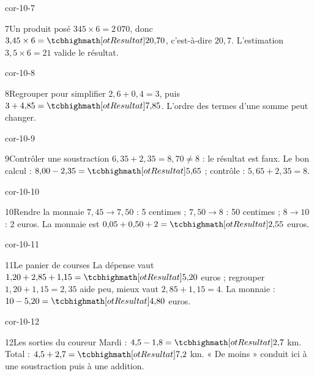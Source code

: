 \begin{blocLivre}{cor-10-7}\begin{corrige}{7}{Un produit posé}
$345\times6=2\,070$, donc $3{,}45\times6=\res{20{,}70}$, c’est-à-dire $20{,}7$. L’estimation $3{,}5\times6=21$ valide le résultat.
\end{corrige}\end{blocLivre}
\begin{blocLivre}{cor-10-8}\begin{corrige}{8}{Regrouper pour simplifier}
$2{,}6+0{,}4=3$, puis $3+4{,}85=\res{7{,}85}$. L’ordre des termes d’une somme peut changer.
\end{corrige}\end{blocLivre}
\begin{blocLivre}{cor-10-9}\begin{corrige}{9}{Contrôler une soustraction}
$6{,}35+2{,}35=8{,}70\ne8$ : le résultat est faux. Le bon calcul : $8{,}00-2{,}35=\res{5{,}65}$ ; contrôle : $5{,}65+2{,}35=8$.
\end{corrige}\end{blocLivre}
\begin{blocLivre}{cor-10-10}\begin{corrige}{10}{Rendre la monnaie}
$7{,}45\to7{,}50$ : 5 centimes ; $7{,}50\to8$ : 50 centimes ; $8\to10$ : 2 euros. La monnaie est $0{,}05+0{,}50+2=\res{2{,}55}$ euros.
\end{corrige}\end{blocLivre}
\begin{blocLivre}{cor-10-11}\begin{corrige}{11}{Le panier de courses}
La dépense vaut $1{,}20+2{,}85+1{,}15=\res{5{,}20}$ euros ; regrouper $1{,}20+1{,}15=2{,}35$ aide peu, mieux vaut $2{,}85+1{,}15=4$. La monnaie : $10-5{,}20=\res{4{,}80}$ euros.
\end{corrige}\end{blocLivre}
\begin{blocLivre}{cor-10-12}\begin{corrige}{12}{Les sorties du coureur}
Mardi : $4{,}5-1{,}8=\res{2{,}7}$ km. Total : $4{,}5+2{,}7=\res{7{,}2}$ km. « De moins » conduit ici à une soustraction puis à une addition.
\end{corrige}\end{blocLivre}

